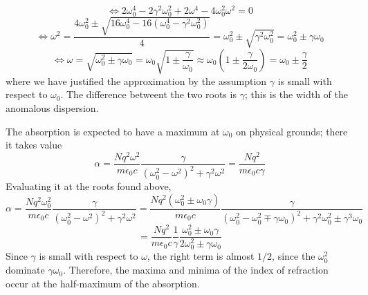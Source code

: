 \documentclass{article}
\begin{document}
\[\Leftrightarrow2\omega_{0}^{4}-2\gamma^{2}\omega_{0}^{2}+2\omega^{4}-4\omega_{0}^{2}\omega^{2}=0\]
\[\Leftrightarrow \omega^{2}=\frac{4\omega_{0}^{2}\pm\sqrt{16\omega_{0}^{4}-16(\omega_{0}^{4}-\gamma^{2}\omega_{0}^{2})}}{4}=\omega_{0}^{2}\pm\sqrt{\gamma^{2}\omega_{0}^{2}}=\omega_{0}^{2}\pm\gamma\omega_{0}\]
\[\Leftrightarrow \omega=\sqrt{\omega_{0}^{2}\pm\gamma\omega_{0}}=\omega_{0}\sqrt{1\pm\frac{\gamma}{\omega_{0}}}\approx\omega_{0}\left( 1\pm\frac{\gamma}{2\omega_{0}} \right)=\omega_{0}\pm\frac{\gamma}{2}\]
where we have justified the approximation by the assumption $\gamma$ is small with respect to $\omega_{0}$.
The difference betweent the two roots is $\gamma$; this is the width of the anomalous dispersion.

The absorption is expected to have a maximum at $\omega_{0}$ on physical grounds; there it takes value
\[\alpha=\frac{Nq^{2}\omega^{2}}{m\epsilon_{0}c}\frac{\gamma}{(\omega_{0}^{2}-\omega^{2})^{2}+\gamma^{2}\omega^{2}}=\frac{Nq^{2}}{m\epsilon_{0}c\gamma}\]Evaluating it at the roots found above,
\[\alpha=\frac{Nq^{2}\omega_{0}^{2}}{m\epsilon_{0}c}\frac{\gamma}{(\omega^{2}_{0}-\omega^{2})^{2}+\gamma^{2}\omega^{2}}=\frac{Nq^{2}(\omega_{0}^{2}\pm\omega_{0}\gamma)}{m\epsilon_{0}c}\frac{\gamma}{(\omega_{0}^{2}-\omega_{0}^{2}\mp\gamma\omega_{0})^{2}+\gamma^{2}\omega_{0}^{2}\pm\gamma^{3}\omega_{0}}\]
\[=\frac{Nq^{2}}{m\epsilon_{0}c}\frac{1}{\gamma}\frac{\omega_{0}^{2}\pm\omega_{0}\gamma}{2\omega_{0}^{2}\pm\gamma\omega_{0}}\]
Since $\gamma$ is small with respect to $\omega$, the right term is almost $1/2$, since the $\omega_{0}^{2}$ dominate $\gamma\omega_{0}$. Therefore, the maxima and minima of the index of refraction occur at the half-maximum of the absorption.
\end{document}
